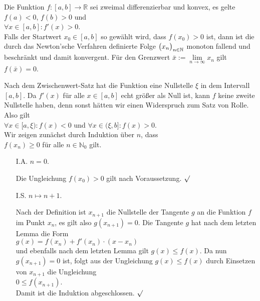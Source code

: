 \begin{Satz} \lb
  Die Funktion $f:[a,b] \rightarrow \mathbb{R}$ sei zweimal differenzierbar und konvex, es gelte
  $f(a) < 0$, $f(b) > 0$ und 
  \\[0.2cm]
  \hspace*{1.3cm}
  $\forall x \in [a,b]: f'(x) > 0$.
  \\[0.2cm]
  Falls der Startwert $x_0 \in [a,b]$ so gew\"ahlt wird, dass $f(x_0) > 0$ ist, 
  dann ist die durch das Newton'sche Verfahren definierte Folge $\bigl(x_n\bigr)_{n\in\mathbb{N}}$ monoton fallend und
  beschr\"ankt und damit konvergent.  F\"ur den Grenzwert
  $\bar{x} := \lim\limits_{n\rightarrow\infty} x_n$
  gilt $f(\bar{x}) = 0$.
\end{Satz}

\proof
Nach dem Zwischenwert-Satz hat die Funktion eine Nullstelle $\xi$ in dem Intervall $[a,b]$.  Da 
$f'(x)$ f\"ur alle $x \in [a,b]$ echt gr\"o{\ss}er als Null ist, kann $f$ keine zweite Nullstelle haben, denn
sonst h\"atten wir einen Widerspruch zum Satz von Rolle.  Also gilt
\\[0.2cm]
\hspace*{1.3cm}
$\forall x \in [a,\xi): f(x) < 0$ \quad und \quad
$\forall x \in (\xi,b]: f(x) > 0$.
\\[0.2cm]
Wir zeigen zun\"achst durch Induktion \"uber $n$, dass 
\\[0.2cm]
\hspace*{1.3cm}
$f(x_n) \geq 0$ \quad f\"ur alle $n \in \mathbb{N}_0$ gilt.  
\begin{enumerate}
\item[I.A.] $n=0$.  

            Die Ungleichung $f(x_0) > 0$  gilt nach Voraussetzung. $\surd$
\item[I.S.] $n \mapsto n+1$.

            Nach der Definition ist $x_{n+1}$ die Nullstelle der Tangente $g$ an die Funktion $f$
            im Punkt $x_n$, es gilt also $g(x_{n+1}) = 0$.  
            Die Tangente $g$ hat nach dem letzten Lemma die Form
            \\[0.2cm]
            \hspace*{1.3cm}
            $g(x) = f(x_n) + f'(x_n) \cdot (x - x_n)$
            \\[0.2cm]
            und ebenfalls nach dem letzten Lemma gilt $g(x) \leq f(x)$.  Da nun $g(x_{n+1}) = 0$ ist,
            folgt aus der Ungleichung $g(x) \leq f(x)$ durch Einsetzen von $x_{n+1}$ die Ungleichung
            \\[0.2cm]
            \hspace*{1.3cm}
            $0 \leq f(x_{n+1})$.
            \\[0.2cm]
            Damit ist die Induktion abgeschlossen. $\surd$
\end{enumerate}
